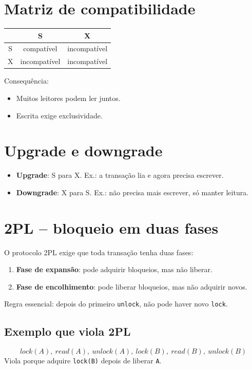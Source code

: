 \documentclass[12pt,a4paper]{article}
\begin{document}
\section{Matriz de compatibilidade}
\begin{center}
\begin{tabular}{|c|c|c|}
\hline
 & S & X \\
\hline
S & compatível & incompatível \\
X & incompatível & incompatível \\
\hline
\end{tabular}
\end{center}

Consequência:
\begin{itemize}
    \item Muitos leitores podem ler juntos.
    \item Escrita exige exclusividade.
\end{itemize}

\section{Upgrade e downgrade}
\begin{itemize}
    \item \textbf{Upgrade}: S para X. Ex.: a transação lia e agora precisa escrever.
    \item \textbf{Downgrade}: X para S. Ex.: não precisa mais escrever, só manter leitura.
\end{itemize}

\section{2PL -- bloqueio em duas fases}
O protocolo 2PL exige que toda transação tenha duas fases:
\begin{enumerate}
    \item \textbf{Fase de expansão}: pode adquirir bloqueios, mas não liberar.
    \item \textbf{Fase de encolhimento}: pode liberar bloqueios, mas não adquirir novos.
\end{enumerate}

Regra essencial: depois do primeiro \texttt{unlock}, não pode haver novo \texttt{lock}.

\subsection{Exemplo que viola 2PL}
\[
lock(A),\ read(A),\ unlock(A),\ lock(B),\ read(B),\ unlock(B)
\]
Viola porque adquire \texttt{lock(B)} depois de liberar \texttt{A}.
\end{document}
